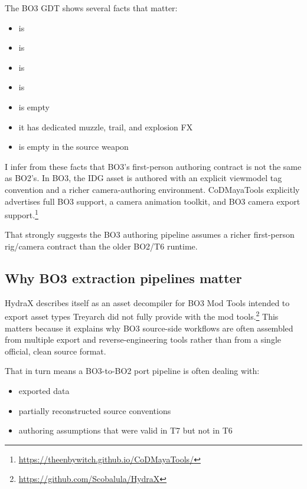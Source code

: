 \documentclass[11pt]{article}
\begin{document}
The BO3 GDT shows several facts that matter:

\begin{itemize}
  \item {} is 
  \item {} is 
  \item {} is 
  \item {} is 
  \item {} is empty
  \item it has dedicated muzzle, trail, and explosion FX
  \item {} is empty in the source weapon
\end{itemize}

I infer from these facts that BO3's first-person authoring contract is not the same as BO2's. In BO3, the IDG asset is authored with an explicit viewmodel tag convention and a richer camera-authoring environment. CoDMayaTools explicitly advertises full BO3 support, a camera animation toolkit, and BO3 camera export support.\footnote{\url{https://theenbywitch.github.io/CoDMayaTools/}}

That strongly suggests the BO3 authoring pipeline assumes a richer first-person rig/camera contract than the older BO2/T6 runtime.

\subsection{Why BO3 extraction pipelines matter}

HydraX describes itself as an asset decompiler for BO3 Mod Tools intended to export asset types Treyarch did not fully provide with the mod tools.\footnote{\url{https://github.com/Scobalula/HydraX}} This matters because it explains why BO3 source-side workflows are often assembled from multiple export and reverse-engineering tools rather than from a single official, clean source format.

That in turn means a BO3-to-BO2 port pipeline is often dealing with:

\begin{itemize}
  \item exported data
  \item partially reconstructed source conventions
  \item authoring assumptions that were valid in T7 but not in T6
\end{itemize}
\end{document}
